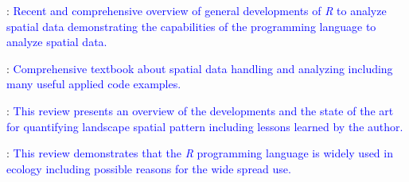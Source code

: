 \documentclass[smallextended]{svjour3}       %
\begin{document}
\noindent \textbullet \textbullet \cite{Bivand2020}: \textcolor{blue}{Recent and comprehensive overview of general developments of \textit{R} to analyze spatial data demonstrating the capabilities of the programming language to analyze spatial data.}

\noindent \textbullet \textbullet \cite{Lovelace2019}: \textcolor{blue}{Comprehensive textbook about spatial data handling and analyzing including many useful applied code examples.}

\noindent \textbullet \cite{Gustafson2019}: \textcolor{blue}{This review presents an overview of the developments and the state of the art for quantifying landscape spatial pattern including lessons learned by the author.}

\noindent \textbullet \cite{Lai2019}: \textcolor{blue}{This review demonstrates that the \textit{R} programming language is widely used in ecology including possible reasons for the wide spread use.}




\end{document}
